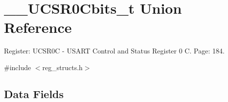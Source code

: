 \hypertarget{union_____u_c_s_r0_cbits__t}{\section{\+\_\+\+\_\+\+U\+C\+S\+R0\+Cbits\+\_\+t Union Reference}
\label{union_____u_c_s_r0_cbits__t}
}


Register\+: U\+C\+S\+R0\+C -\/ U\+S\+A\+R\+T Control and Status Register 0 C. Page\+: 184.  




{\ttfamily \#include $<$reg\+\_\+structs.\+h$>$}

\subsection*{Data Fields}
